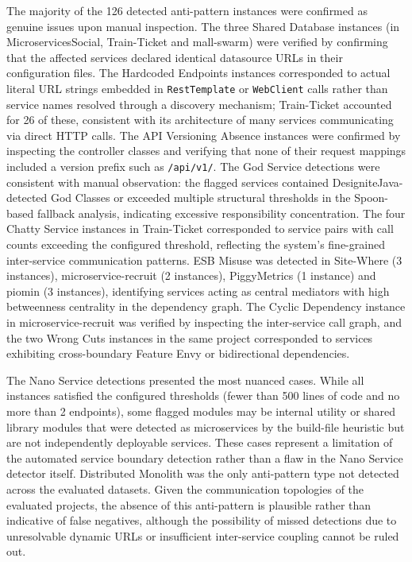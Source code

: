 \par The majority of the 126 detected anti-pattern instances were confirmed as genuine issues upon manual inspection. The three Shared Database instances (in MicroservicesSocial, Train-Ticket and mall-swarm) were verified by confirming that the affected services declared identical datasource URLs in their configuration files. The Hardcoded Endpoints instances corresponded to actual literal URL strings embedded in \texttt{RestTemplate} or \texttt{WebClient} calls rather than service names resolved through a discovery mechanism; Train-Ticket accounted for 26 of these, consistent with its architecture of many services communicating via direct HTTP calls. The API Versioning Absence instances were confirmed by inspecting the controller classes and verifying that none of their request mappings included a version prefix such as \texttt{/api/v1/}. The God Service detections were consistent with manual observation: the flagged services contained DesigniteJava-detected God Classes or exceeded multiple structural thresholds in the Spoon-based fallback analysis, indicating excessive responsibility concentration. The four Chatty Service instances in Train-Ticket corresponded to service pairs with call counts exceeding the configured threshold, reflecting the system's fine-grained inter-service communication patterns. ESB Misuse was detected in Site-Where (3 instances), microservice-recruit (2 instances), PiggyMetrics (1 instance) and piomin (3 instances), identifying services acting as central mediators with high betweenness centrality in the dependency graph. The Cyclic Dependency instance in microservice-recruit was verified by inspecting the inter-service call graph, and the two Wrong Cuts instances in the same project corresponded to services exhibiting cross-boundary Feature Envy or bidirectional dependencies.

\par The Nano Service detections presented the most nuanced cases. While all instances satisfied the configured thresholds (fewer than 500 lines of code and no more than 2 endpoints), some flagged modules may be internal utility or shared library modules that were detected as microservices by the build-file heuristic but are not independently deployable services. These cases represent a limitation of the automated service boundary detection rather than a flaw in the Nano Service detector itself. Distributed Monolith was the only anti-pattern type not detected across the evaluated datasets. Given the communication topologies of the evaluated projects, the absence of this anti-pattern is plausible rather than indicative of false negatives, although the possibility of missed detections due to unresolvable dynamic URLs or insufficient inter-service coupling cannot be ruled out.

